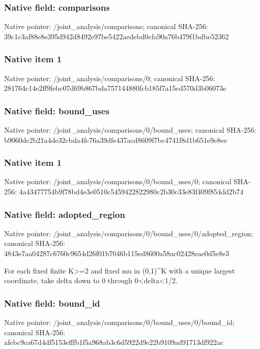 \documentclass[10pt,a4paper]{article}
\begin{document}
\subsubsection{Native field: comparisons}
Native pointer: /joint\_\allowbreak{}analysis/comparisons; canonical SHA-256: 39c1c3af88e8e395d942d8492e97be5422aedebd0cfa90a76b479f1bdbe52362

\subsubsection{Native item 1}
Native pointer: /joint\_\allowbreak{}analysis/comparisons/0; canonical SHA-256: 281764c14e2ff9febc07d69b867bda757144880fcb185f7a15cd570d3b06073e

\subsubsection{Native field: bound\_\allowbreak{}uses}
Native pointer: /joint\_\allowbreak{}analysis/comparisons/0/bound\_\allowbreak{}uses; canonical SHA-256: b9060dc2b21a4de32cbda4fc76a39dfe437acd8609f7bc4741f8d1b651e9e8ee

\subsubsection{Native item 1}
Native pointer: /joint\_\allowbreak{}analysis/comparisons/0/bound\_\allowbreak{}uses/0; canonical SHA-256: 4a43477754b9f78bd4e3e0510c5459422822980c2b30c33e83f409f854dd2b74

\subsubsection{Native field: adopted\_\allowbreak{}region}
Native pointer: /joint\_\allowbreak{}analysis/comparisons/0/bound\_\allowbreak{}uses/0/adopted\_\allowbreak{}region; canonical SHA-256: 4843e7aa04287c6760c9654d26f01b7046b115ed8600a58ac02428eae0d5e8e3

\begingroup\raggedright\sloppy For each fixed finite K>=\allowbreak{}2 and fixed mu in (0,\allowbreak{}1)\textasciicircum{}K with a unique largest coordinate,\allowbreak{} take delta down to 0 through 0<delta<1/\allowbreak{}2.\par\endgroup

\subsubsection{Native field: bound\_\allowbreak{}id}
Native pointer: /joint\_\allowbreak{}analysis/comparisons/0/bound\_\allowbreak{}uses/0/bound\_\allowbreak{}id; canonical SHA-256: afebc9ca67d4df5153efffb1f5a968ab3c6d5922d9e22b9109ad91713df922ac
\end{document}
